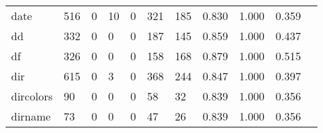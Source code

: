 \begin{longtable}{lp{1.2cm}p{1.2cm}p{1.2cm}p{1.2cm}p{1.2cm}p{1.2cm}p{1.2cm}p{1.2cm}p{1.2cm}p{1.2cm}}
date      &                                   516 &                                                  0 &                                                 10 &                                                  0 &                                                321 &                                                185 &                                              0.830 &                                              1.000 &                                              0.359 \\
dd        &                                   332 &                                                  0 &                                                  0 &                                                  0 &                                                187 &                                                145 &                                              0.859 &                                              1.000 &                                              0.437 \\
df        &                                   326 &                                                  0 &                                                  0 &                                                  0 &                                                158 &                                                168 &                                              0.879 &                                              1.000 &                                              0.515 \\
dir       &                                   615 &                                                  0 &                                                  3 &                                                  0 &                                                368 &                                                244 &                                              0.847 &                                              1.000 &                                              0.397 \\
dircolors &                                    90 &                                                  0 &                                                  0 &                                                  0 &                                                 58 &                                                 32 &                                              0.839 &                                              1.000 &                                              0.356 \\
dirname   &                                    73 &                                                  0 &                                                  0 &                                                  0 &                                                 47 &                                                 26 &                                              0.839 &                                              1.000 &                                              0.356 \\

\end{longtable}
